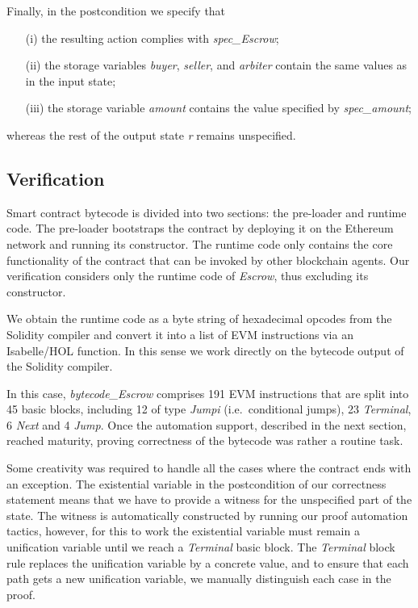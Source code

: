 \documentclass[sigplan,10pt]{acmart}\settopmatter{printfolios=true,printccs=false,printacmref=false}
\begin{document}
Finally, in the postcondition we specify that 
\begin{enumerate}
\item[(i)] the resulting action complies with \textit{spec\_Escrow};
\item[(ii)] the storage variables \textit{buyer}, \textit{seller}, and \textit{arbiter}
      contain the same values as in the input state;
\item[(iii)] the storage variable \textit{amount} contains the value
             specified by \textit{spec\_amount};
\end{enumerate}
%
whereas the rest of the output state \textit{r} remains unspecified.
%
\subsection{Verification}
\label{sec:verif}
Smart contract bytecode is divided into two sections: the pre-loader and
runtime code.
The pre-loader bootstraps the contract by deploying it on the
Ethereum network and running its constructor.
The runtime code only contains the core functionality of the contract
that can be invoked by other blockchain agents.
Our verification considers only the runtime code of \textit{Escrow},
thus excluding its constructor.

We obtain the runtime code as a byte string of hexadecimal opcodes
from the Solidity compiler and convert it into a list of EVM instructions via an
Isabelle/HOL function.
In this sense we work directly on the bytecode output of
the Solidity compiler.
 
In this case, \textit{bytecode\_Escrow} comprises 191 EVM instructions that are split into 45 basic
blocks, including 12 of type \textit{Jumpi} (i.e.\ conditional jumps),
23 \textit{Terminal}, 6 \textit{Next} and 4 \textit{Jump}.
Once the automation support, described in the next section, reached maturity,
proving correctness of the bytecode was rather a routine task. %

Some creativity was required to handle all the cases where the
contract ends with an exception.
The existential variable in the postcondition of our correctness
statement means that we have to provide a witness for the
unspecified part of the state.
The witness is automatically constructed by running our
proof automation tactics, however, for this to work the
existential variable must remain a unification variable until
we reach a \textit{Terminal} basic block.
The \textit{Terminal} block rule replaces the
unification variable by a concrete value,
and to ensure that each path gets a new unification
variable, we manually distinguish each case in the proof.
\end{document}

